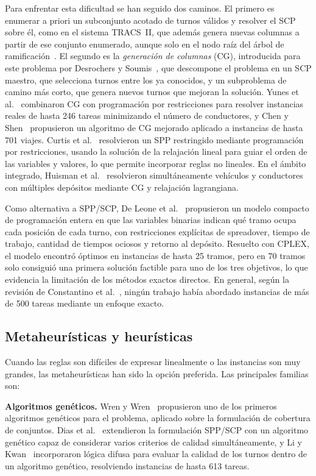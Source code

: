 \documentclass[letter, 10pt]{article}
\begin{document}
Para enfrentar esta dificultad se han seguido dos caminos. El primero es enumerar a priori un subconjunto acotado de turnos válidos y resolver el SCP sobre él, como en el sistema TRACS~II, que además genera nuevas columnas a partir de ese conjunto enumerado, aunque solo en el nodo raíz del árbol de ramificación~\cite{Fores2002}. El segundo es la \emph{generación de columnas} (CG), introducida para este problema por Desrochers y Soumis~\cite{DesrochersSoumis1989}, que descompone el problema en un SCP maestro, que selecciona turnos entre los ya conocidos, y un subproblema de camino más corto, que genera nuevos turnos que mejoran la solución. Yunes et al.~\cite{Yunes2005} combinaron CG con programación por restricciones para resolver instancias reales de hasta 246 tareas minimizando el número de conductores, y Chen y Shen~\cite{ChenShen2013} propusieron un algoritmo de CG mejorado aplicado a instancias de hasta 701 viajes. Curtis et al.~\cite{Curtis1999} resolvieron un SPP restringido mediante programación por restricciones, usando la solución de la relajación lineal para guiar el orden de las variables y valores, lo que permite incorporar reglas no lineales. En el ámbito integrado, Huisman et al.~\cite{Huisman2005} resolvieron simultáneamente vehículos y conductores con múltiples depósitos mediante CG y relajación lagrangiana.

Como alternativa a SPP/SCP, De Leone et al.~\cite{DeLeone2011a} propusieron un modelo compacto de programación entera en que las variables binarias indican qué tramo ocupa cada posición de cada turno, con restricciones explícitas de spreadover, tiempo de trabajo, cantidad de tiempos ociosos y retorno al depósito. Resuelto con CPLEX, el modelo encontró óptimos en instancias de hasta 25 tramos, pero en 70 tramos solo consiguió una primera solución factible para uno de los tres objetivos, lo que evidencia la limitación de los métodos exactos directos. En general, según la revisión de Constantino et al.~\cite{Constantino2017}, ningún trabajo había abordado instancias de más de 500 tareas mediante un enfoque exacto.

\subsection{Metaheurísticas y heurísticas}
Cuando las reglas son difíciles de expresar linealmente o las instancias son muy grandes, las metaheurísticas han sido la opción preferida. Las principales familias son:

\textbf{Algoritmos genéticos.} Wren y Wren~\cite{WrenWren1995} propusieron uno de los primeros algoritmos genéticos para el problema, aplicado sobre la formulación de cobertura de conjuntos. Dias et al.~\cite{Dias2002} extendieron la formulación SPP/SCP con un algoritmo genético capaz de considerar varios criterios de calidad simultáneamente, y Li y Kwan~\cite{LiKwan2003} incorporaron lógica difusa para evaluar la calidad de los turnos dentro de un algoritmo genético, resolviendo instancias de hasta 613 tareas.
\end{document}
